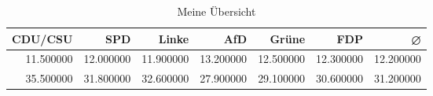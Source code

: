 \begin{table}
\caption{Meine Übersicht}
\label{tab:meine_tabelle}
\begin{tabular}{rrrrrrr}
\toprule
CDU/CSU & SPD & Linke & AfD & Grüne & FDP & ⌀ \\
\midrule
11.500000 & 12.000000 & 11.900000 & 13.200000 & 12.500000 & 12.300000 & 12.200000 \\
35.500000 & 31.800000 & 32.600000 & 27.900000 & 29.100000 & 30.600000 & 31.200000 \\
\bottomrule
\end{tabular}
\end{table}
